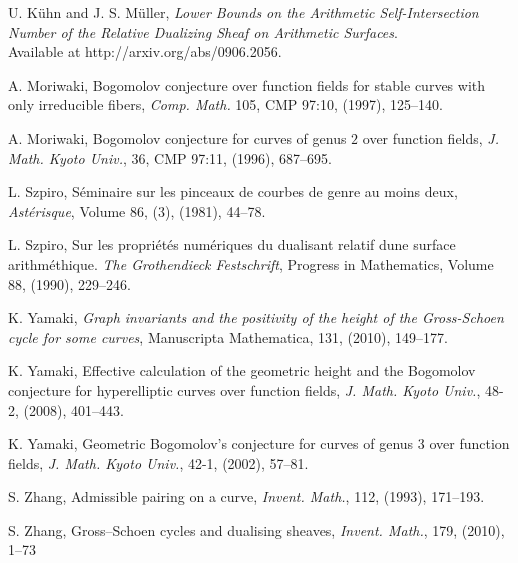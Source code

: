 \documentclass[12pt]{amsart}
\theoremstyle{example}
\theoremstyle{definition}
\theoremstyle{notation}
\begin{document}
\begin{thebibliography}{999}
 U. K\"{u}hn and J. S. M\"{u}ller, {\em Lower Bounds on the Arithmetic Self-Intersection Number of the Relative Dualizing Sheaf on Arithmetic Surfaces}.  \\Available at http://arxiv.org/abs/0906.2056.

 A. Moriwaki, Bogomolov conjecture over function fields for stable curves with only
irreducible fibers, {\em Comp. Math.} 105, CMP 97:10, (1997), 125--140.

 A. Moriwaki, Bogomolov conjecture for curves of genus $2$ over function fields,
{\em J. Math. Kyoto Univ.}, 36, CMP 97:11, (1996), 687--695.

 L. Szpiro, S\'{e}minaire sur les pinceaux de courbes de genre au moins deux, {\em Ast\'{e}risque}, Volume 86, (3), (1981), 44--78.

 L. Szpiro, Sur les propriétés numériques du dualisant relatif dune surface arithméthique.  {\em The Grothendieck Festschrift}, Progress in Mathematics, Volume 88, (1990), 229--246.

 K. Yamaki, {\em Graph invariants and the positivity of the height of the Gross-Schoen cycle for some curves},
Manuscripta Mathematica, 131, (2010), 149--177.

 K. Yamaki, Effective calculation of the geometric height and the Bogomolov
conjecture for hyperelliptic curves over function fields,
{\em J. Math. Kyoto Univ.}, 48-2, (2008), 401--443.

 K. Yamaki, Geometric Bogomolov's conjecture for curves of genus $3$ over function fields,
{\em J. Math. Kyoto Univ.}, 42-1, (2002), 57--81.

 S. Zhang, Admissible pairing on a curve,
{\em Invent. Math.}, 112, (1993), 171--193.

 S. Zhang, Gross--Schoen cycles and dualising sheaves,
{\em Invent. Math.}, 179, (2010), 1--73

\end{thebibliography}
\end{document}
